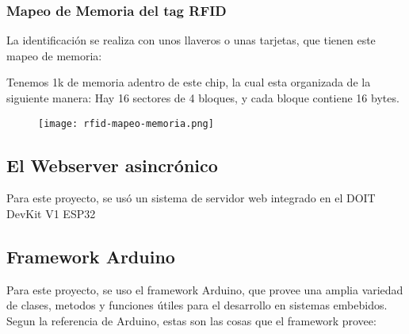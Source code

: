 \documentclass[../informe_krapp.tex]{subfiles}
\begin{document}
\clearpage
\subsubsection{Mapeo de Memoria del tag RFID}
La identificación se realiza con unos llaveros o unas tarjetas,
que tienen este mapeo de memoria:

Tenemos 1k de memoria adentro de este chip, la cual esta organizada de la
siguiente manera: Hay 16 sectores de 4 bloques, y cada bloque contiene 16 bytes.

\begin{figure}[H]
	\centering
	\texttt{[image: rfid-mapeo-memoria.png]}
\end{figure}

\subsection{El Webserver asincrónico}
Para este proyecto, se usó un sistema de servidor web integrado en el DOIT DevKit V1 ESP32

\subsection{Framework Arduino}
Para este proyecto, se uso el framework Arduino, que provee una amplia variedad de
clases, metodos y funciones útiles para el desarrollo en sistemas embebidos.
Segun la referencia de Arduino\cite{arduino_reference}, estas son las cosas que
el framework provee:
\end{document}

